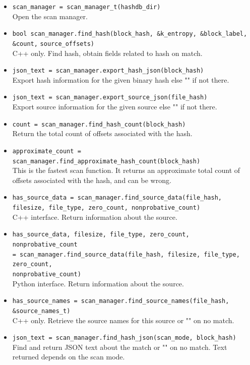 \documentclass[11pt,fleqn]{article} %
\begin{document}
\begin{itemize}
\item \verb+scan_manager = scan_manager_t(hashdb_dir)+\\
Open the scan manager.
\item \verb+bool scan_manager.find_hash(block_hash, &k_entropy, &block_label, &count,+ \verb+source_offsets)+\\
C++ only. Find hash, obtain fields related to hash on match.
\item \verb+json_text = scan_manager.export_hash_json(block_hash)+\\
Export hash information for the given binary hash else "" if not there.
\item \verb+json_text = scan_manager.export_source_json(file_hash)+\\
Export source information for the given source else "" if not there.
\item \verb+count = scan_manager.find_hash_count(block_hash)+\\
Return the total count of offsets associated with the hash.
\item \verb+approximate_count = scan_manager.find_approximate_hash_count(block_hash)+\\
This is the fastest scan function. It returns an approximate total count of offsets associated with the hash, and can be wrong.
\item \verb+has_source_data = scan_manager.find_source_data(file_hash,+\\
\verb+filesize, file_type, zero_count, nonprobative_count)+\\
C++ interface. Return information about the source.
\item \verb+has_source_data, filesize, file_type, zero_count, nonprobative_count+\\
\verb+= scan_manager.find_source_data(file_hash, filesize, file_type, zero_count,+\\
\verb+nonprobative_count)+\\
Python interface. Return information about the source.
\item \verb+has_source_names = scan_manager.find_source_names(file_hash,+\\
\verb+&source_names_t)+\\
C++ only. Retrieve the source names for this source or "" on no match.
\item \verb+json_text = scan_manager.find_hash_json(scan_mode, block_hash)+\\
Find and return JSON text about the match or "" on no match. Text returned depends on the scan mode.

\end{itemize}
\end{document}
